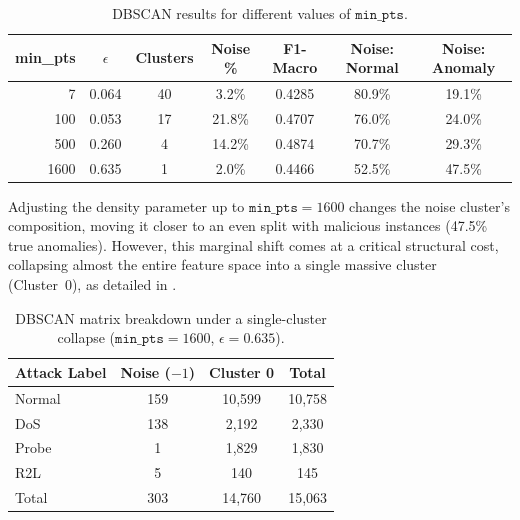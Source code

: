     \begin{table}[H]
        \centering
        \begin{tabular}{@{}rcccccc@{}}
            \toprule
            \textbf{min\_pts} & \textbf{$\epsilon$} & \textbf{Clusters} & \textbf{Noise \%} & \textbf{F1-Macro} & \textbf{Noise: Normal} & \textbf{Noise: Anomaly} \\
            \midrule
            7    & 0.064 & 40 & 3.2\%  & 0.4285 & 80.9\% & 19.1\% \\
            100  & 0.053 & 17 & 21.8\% & 0.4707 & 76.0\% & 24.0\% \\
            500  & 0.260 & 4  & 14.2\% & 0.4874 & 70.7\% & 29.3\% \\
            1600 & 0.635 & 1  & 2.0\%  & 0.4466 & 52.5\% & 47.5\% \\
            \bottomrule
        \end{tabular}
        \vspace{0.5em}
        \caption{DBSCAN results for different values of $\texttt{min\_pts}$.}
        \label{tab:dbscan_comparison}
    \end{table}

    \vspace{-0.3cm}

    \noindent
    Adjusting the density parameter up to $\texttt{min\_pts}=1600$ changes the noise cluster's composition, moving it closer to an even split with malicious instances (47.5\% true anomalies). 
    However, this marginal shift comes at a critical structural cost, collapsing almost the entire feature space into a single massive cluster (Cluster~0), as detailed in .

    \begin{table}[H]
        \centering
        \begin{tabular}{@{}lccc@{}}
            \toprule
            \textbf{Attack Label} & \textbf{Noise ($-1$)} & \textbf{Cluster 0} & \textbf{Total} \\
            \midrule
            Normal & 159 & 10,599 & 10,758 \\
            DoS    & 138 & 2,192  & 2,330  \\
            Probe  & 1   & 1,829  & 1,830  \\
            R2L    & 5   & 140    & 145    \\
            \midrule
            Total  & 303 & 14,760 & 15,063 \\
            \bottomrule
        \end{tabular}
        \vspace{0.5em}
        \caption{DBSCAN matrix breakdown under a single-cluster collapse ($\texttt{min\_pts} = 1600$, $\epsilon = 0.635$).}
        \label{tab:dbscan_clusters}
    \end{table}
    
